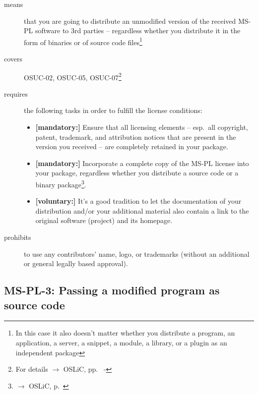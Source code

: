\begin{description}
\item[means] that you are going to distribute an unmodified version of the
received MS-PL software to 3rd parties -- regardless whether you distribute it
in the form of binaries or of source code files\footnote{In this case it also
doesn't matter whether you distribute a program, an application, a server, a
snippet, a module, a library, or a plugin as an independent package}

\item[covers] OSUC-02, OSUC-05, OSUC-07\footnote{For details $\rightarrow$ OSLiC, pp.\
\pageref{OSUC-02-DEF} - \pageref{OSUC-07-DEF}}

\item[requires] the following tasks in order to fulfill the license conditions:
\begin{itemize}
  \item \textbf{[mandatory:]} Ensure that all licensing elements -- esp.\ all
  copyright, patent, trademark, and attribution notices that are present in the
  version you received -- are completely retained in your package.
  
  \item \textbf{[mandatory:]} Incorporate a complete copy of the MS-PL license
  into your package, regardless whether you distribute a source code or a binary
  package\footnote{$\rightarrow$ OSLiC, p.\ \pageref{MsplSourceBinHint}}.
  
  \item \textbf{[voluntary:]} It's a good tradition to let the documentation of
  your distribution and/or your additional material also contain a link to the
  original software (project) and its homepage.
\end{itemize}

\item[prohibits] to use any contributors' name, logo, or trademarks (without an
additional or general legally based approval).

\end{description}

\subsection{MS-PL-3: Passing a modified program as source code}
\label{OSUC-04-MS-PL}

